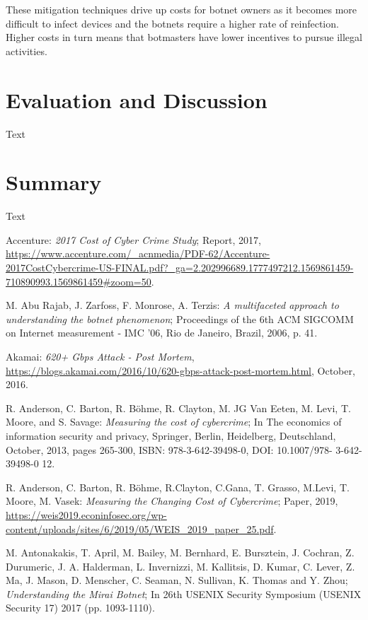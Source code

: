 These mitigation techniques drive up costs for botnet owners as it becomes more difficult to infect devices and the botnets require a higher rate of reinfection. Higher costs in turn means that botmasters have lower incentives to pursue illegal activities.


\section{Evaluation and Discussion}
Text

\section{Summary}
Text

\begin{thebibliography}{99}
 Accenture: \emph{2017 Cost of Cyber Crime Study}; Report, 2017, \url{https://www.accenture.com/_acnmedia/PDF-62/Accenture-2017CostCybercrime-US-FINAL.pdf?_ga=2.202996689.1777497212.1569861459-710890993.1569861459#zoom=50}.

 M. Abu Rajab, J. Zarfoss, F. Monrose, A. Terzis: \emph{A multifaceted approach to understanding the botnet phenomenon}; Proceedings of the 6th ACM SIGCOMM on Internet measurement  - IMC '06, Rio de Janeiro, Brazil, 2006, p. 41.

 Akamai: \emph{620+ Gbps Attack - Post Mortem}, \url{https://blogs.akamai.com/2016/10/620-gbps-attack-post-mortem.html}, October, 2016.

 R. Anderson, C. Barton, R. Böhme, R. Clayton, M. JG Van Eeten, M. Levi, T. Moore, and S. Savage: \emph{Measuring the cost of cybercrime}; In The economics of information security and privacy, Springer, Berlin, Heidelberg, Deutschland, October, 2013, pages 265-300, ISBN: 978-3-642-39498-0, DOI: 10.1007/978- 3-642-39498-0 12.

 R. Anderson, C. Barton, R. Böhme, R.Clayton, C.Gana, T. Grasso, M.Levi, T. Moore, M. Vasek: \emph{Measuring the Changing Cost of Cybercrime}; Paper, 2019, \url{https://weis2019.econinfosec.org/wp-content/uploads/sites/6/2019/05/WEIS_2019_paper_25.pdf}.

 M. Antonakakis, T. April, M. Bailey, M. Bernhard, E. Bursztein, J. Cochran, Z. Durumeric, J. A. Halderman, L. Invernizzi, M. Kallitsis, D. Kumar, C. Lever, Z. Ma, J. Mason, D. Menscher, C. Seaman, N. Sullivan, K. Thomas and Y. Zhou; \emph{Understanding the Mirai Botnet}; In 26th {USENIX} Security Symposium ({USENIX} Security 17) 2017 (pp. 1093-1110).


\end{thebibliography}
